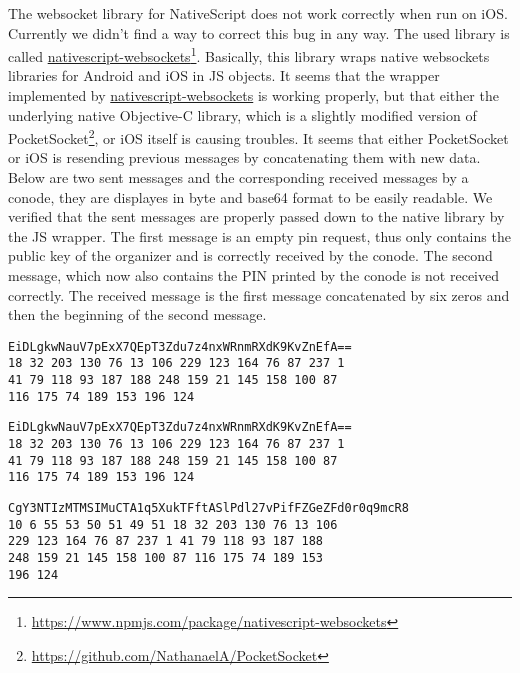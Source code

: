\begin{description}[style=nextline]
\item[WebSocket Bug (iOS)] The websocket library for NativeScript does not work correctly when run on iOS. Currently we didn't find a way to correct this bug in any way. The used library is called \url{nativescript-websockets}\footnote{\url{https://www.npmjs.com/package/nativescript-websockets}}. Basically, this library wraps native websockets libraries for Android and iOS in JS objects. It seems that the wrapper implemented by \url{nativescript-websockets} is working properly, but that either the underlying native Objective-C library, which is a slightly modified version of PocketSocket\footnote{\url{https://github.com/NathanaelA/PocketSocket}}, or iOS itself is causing troubles. It seems that either PocketSocket or iOS is resending previous messages by concatenating them with new data. Below are two sent messages and the corresponding received messages by a conode, they are displayes in byte and base64 format to be easily readable. We verified that the sent messages are properly passed down to the native library by the JS wrapper. The first message is an empty pin request, thus only contains the public key of the organizer and is correctly received by the conode. The second message, which now also contains the PIN printed by the conode is not received correctly. The received message is the first message concatenated by six zeros and then the beginning of the second message.
\begin{description}[style=nextline]
\item[Sent]
\begin{lstlisting}
EiDLgkwNauV7pExX7QEpT3Zdu7z4nxWRnmRXdK9KvZnEfA==
18 32 203 130 76 13 106 229 123 164 76 87 237 1
41 79 118 93 187 188 248 159 21 145 158 100 87
116 175 74 189 153 196 124
\end{lstlisting}

\item[Received]
\begin{lstlisting}
EiDLgkwNauV7pExX7QEpT3Zdu7z4nxWRnmRXdK9KvZnEfA==
18 32 203 130 76 13 106 229 123 164 76 87 237 1
41 79 118 93 187 188 248 159 21 145 158 100 87
116 175 74 189 153 196 124
\end{lstlisting}
\end{description}
\begin{description}[style=nextline]
\item[Sent]
\begin{lstlisting}
CgY3NTIzMTMSIMuCTA1q5XukTFftASlPdl27vPifFZGeZFd0r0q9mcR8
10 6 55 53 50 51 49 51 18 32 203 130 76 13 106
229 123 164 76 87 237 1 41 79 118 93 187 188
248 159 21 145 158 100 87 116 175 74 189 153
196 124
\end{lstlisting}


\end{description}
\end{description}
